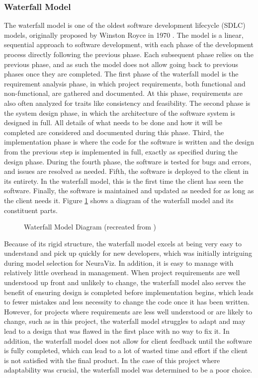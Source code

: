 \subsubsection{Waterfall Model}
The waterfall model is one of the oldest software development lifecycle (SDLC) models, originally proposed by Winston Royce in 1970 \cite{Gagan2020}. The model is a linear, sequential approach to software development, with each phase of the development process directly following the previous phase. Each subsequent phase relies on the previous phase, and as such the model does not allow going back to previous phases once they are completed. The first phase of the waterfall model is the requirement analysis phase, in which project requirements, both functional and non-functional, are gathered and documented. At this phase, requirements are also often analyzed for traits like consistency and feasibility. The second phase is the system design phase, in which the architecture of the software system is designed in full. All details of what needs to be done and how it will be completed are considered and documented during this phase. Third, the implementation phase is where the code for the software is written and the design from the previous step is implemented in full, exactly as specified during the design phase. During the fourth phase, the software is tested for bugs and errors, and issues are resolved as needed. Fifth, the software is deployed to the client in its entirety. In the waterfall model, this is the first time the client has seen the software. Finally, the software is maintained and updated as needed for as long as the client needs it. Figure \ref{fig:waterfall_model} shows a diagram of the waterfall model and its constituent parts.

\begin{figure}[htb]
    \centering
    
    \caption[Waterfall Model Diagram]{Waterfall Model Diagram (recreated from \cite{tutorialspoint})}
    \label{fig:waterfall_model}
\end{figure}

Because of its rigid structure, the waterfall model excels at being very easy to understand and pick up quickly for new developers, which was initially intriguing during model selection for NeuraViz. In addition, it is easy to manage with relatively little overhead in management. When project requirements are well understood up front and unlikely to change, the waterfall model also serves the benefit of ensuring design is completed before implementation begins, which leads to fewer mistakes and less necessity to change the code once it has been written. However, for projects where requirements are less well understood or are likely to change, such as in this project, the waterfall model struggles to adapt and may lead to a design that was flawed in the first place with no way to fix it. In addition, the waterfall model does not allow for client feedback until the software is fully completed, which can lead to a lot of wasted time and effort if the client is not satisfied with the final product. In the case of this project where adaptability was crucial, the waterfall model was determined to be a poor choice.

